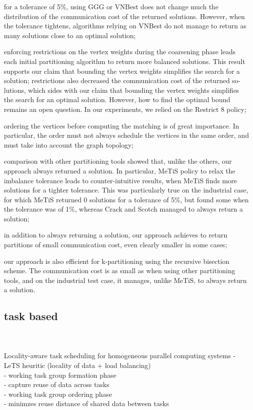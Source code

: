\documentclass{article}
\begin{document}
for a tolerance of 5\%, using GGG or VNBest does not change much the distribution of the communication cost of the returned solutions. However, when the tolerance tightens, algorithms relying on VNBest do not manage to return as many solutions close to an optimal solution; 

enforcing restrictions on the vertex weights during the coarsening phase leads each initial partitioning algorithm to return more balanced solutions. This result supports our claim that bounding the vertex weights simplifies the search for a solution; 
restrictions also decreased the communication cost of the returned so- lutions, which sides with our claim that bounding the vertex weights simplifies the search for an optimal solution. However, how to find the optimal bound remains an open question. In our experiments, we relied on the Restrict 8 policy; 

ordering the vertices before computing the matching is of great importance. In particular, the order must not always schedule the vertices in the same order, and must take into account the graph topology; 

comparison with other partitioning tools showed that, unlike the others, our approach always returned a solution. In particular, MeTiS policy to relax the imbalance tolerance leads to counter-intuitive results, when MeTiS finds more solutions for a tighter tolerance. This was particularly true on the industrial case, for which MeTiS returned 0 solutions for a tolerance of 5\%, but found some when the tolerance was of 1\%, whereas Crack and Scotch managed to always return a solution; 

in addition to always returning a solution, our approach achieves to return partitions of small communication cost, even clearly smaller in some cases; 

our approach is also efficient for k-partitioning using the recursive bisection scheme. The communication cost is as small as when using other partitioning tools, and on the industrial test case, it manages, unlike MeTiS, to always return a solution. 



\subsection{task based}

\cite{CPE:CPE1631}\\
\cite{Bhatti2017}\\
Locality-aware task scheduling for homogeneous parallel computing systems
- LeTS heuritic (locality of data + load balancing)\\ 
- working task group formation phase\\
	- capture reuse of data across tasks\\
- working task group ordering phase\\
	- minimzes reuse distance of shared data between tasks\\
\end{document}
